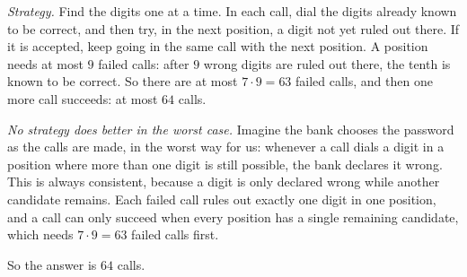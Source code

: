 \emph{Strategy.} Find the digits one at a time. In each call, dial the digits already known to be correct, and then try, in the next position, a digit not yet ruled out there. If it is accepted, keep going in the same call with the next position. A position needs at most $9$ failed calls: after $9$ wrong digits are ruled out there, the tenth is known to be correct. So there are at most $7\cdot9=63$ failed calls, and then one more call succeeds: at most $64$ calls.

\emph{No strategy does better in the worst case.} Imagine the bank chooses the password as the calls are made, in the worst way for us: whenever a call dials a digit in a position where more than one digit is still possible, the bank declares it wrong. This is always consistent, because a digit is only declared wrong while another candidate remains. Each failed call rules out exactly one digit in one position, and a call can only succeed when every position has a single remaining candidate, which needs $7\cdot9=63$ failed calls first.

So the answer is $\boxed{64}$ calls.
